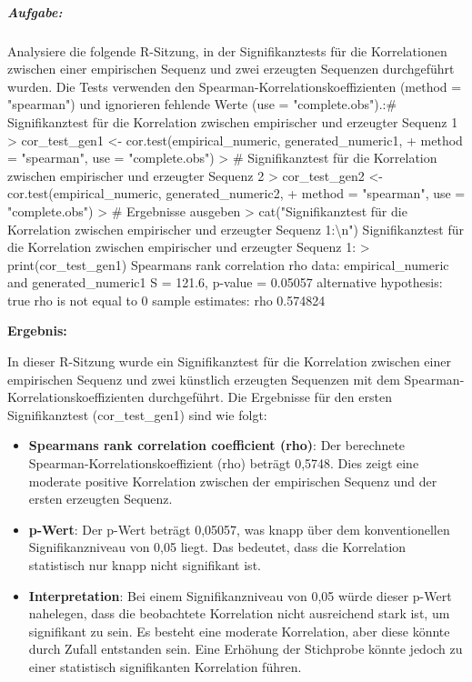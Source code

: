 \documentclass[
]{article}
\begin{document}
\subparagraph{\texorpdfstring{
\textbf{Aufgabe:}}{ Aufgabe:}}\label{aufgabe-4}

Analysiere die folgende R-Sitzung, in der Signifikanztests für die
Korrelationen zwischen einer empirischen Sequenz und zwei erzeugten
Sequenzen durchgeführt wurden. Die Tests verwenden den
Spearman-Korrelationskoeffizienten (method = "spearman") und ignorieren
fehlende Werte (use = "complete.obs").:\textquotesingle\#
Signifikanztest für die Korrelation zwischen empirischer und erzeugter
Sequenz 1 \textgreater{} cor\_test\_gen1 \textless-
cor.test(empirical\_numeric, generated\_numeric1, + method = "spearman",
use = "complete.obs") \textgreater{} \# Signifikanztest für die
Korrelation zwischen empirischer und erzeugter Sequenz 2 \textgreater{}
cor\_test\_gen2 \textless- cor.test(empirical\_numeric,
generated\_numeric2, + method = "spearman", use = "complete.obs")
\textgreater{} \# Ergebnisse ausgeben \textgreater{}
cat("Signifikanztest für die Korrelation zwischen empirischer und
erzeugter Sequenz 1:\textbackslash n") Signifikanztest für die
Korrelation zwischen empirischer und erzeugter Sequenz 1: \textgreater{}
print(cor\_test\_gen1) Spearman\textquotesingle s rank correlation rho
data: empirical\_numeric and generated\_numeric1 S = 121.6, p-value =
0.05057 alternative hypothesis: true rho is not equal to 0 sample
estimates: rho 0.574824 \textquotesingle{}

\textbf{Ergebnis:}

In dieser R-Sitzung wurde ein Signifikanztest für die Korrelation
zwischen einer empirischen Sequenz und zwei künstlich erzeugten
Sequenzen mit dem Spearman-Korrelationskoeffizienten durchgeführt. Die
Ergebnisse für den ersten Signifikanztest (cor\_test\_gen1) sind wie
folgt:

\begin{itemize}
\item
  \textbf{Spearman\textquotesingle s rank correlation coefficient
  (rho)}: Der berechnete Spearman-Korrelationskoeffizient (rho) beträgt
  0,5748. Dies zeigt eine moderate positive Korrelation zwischen der
  empirischen Sequenz und der ersten erzeugten Sequenz.
\item
  \textbf{p-Wert}: Der p-Wert beträgt 0,05057, was knapp über dem
  konventionellen Signifikanzniveau von 0,05 liegt. Das bedeutet, dass
  die Korrelation statistisch nur knapp nicht signifikant ist.
\item
  \textbf{Interpretation}: Bei einem Signifikanzniveau von 0,05 würde
  dieser p-Wert nahelegen, dass die beobachtete Korrelation nicht
  ausreichend stark ist, um signifikant zu sein. Es besteht eine
  moderate Korrelation, aber diese könnte durch Zufall entstanden sein.
  Eine Erhöhung der Stichprobe könnte jedoch zu einer statistisch
  signifikanten Korrelation führen.
\end{itemize}
\end{document}
